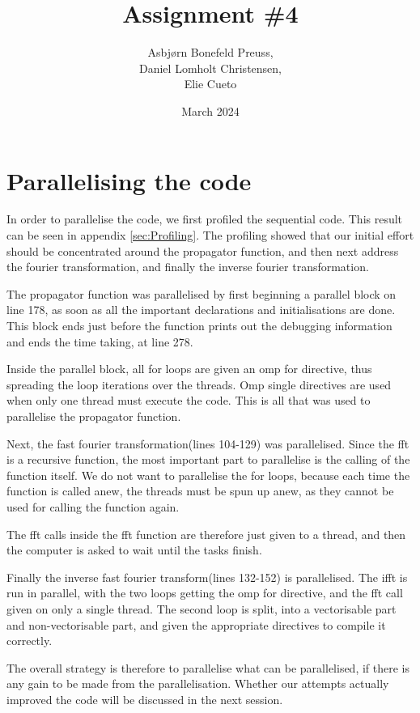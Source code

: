 \documentclass{article}
\title{Assignment \#4}
\author{Asbjørn Bonefeld Preuss,\\ Daniel Lomholt Christensen,\\ Elie Cueto}
\date{March 2024}
\begin{document}
\maketitle
\section{Parallelising the code}\label{sec:taskone}
In order to parallelise the code, we first profiled the sequential code. This result can be seen in appendix \ref{sec:Profiling}. The profiling showed that our initial effort should be concentrated around the propagator function, and then next address the fourier transformation, and finally the inverse fourier transformation.

The propagator function was parallelised by first beginning a parallel block on line 178, as soon as all the important declarations and initialisations are done. This block ends just before the function prints out the debugging information and ends the time taking, at line 278. 

Inside the parallel block, all for loops are given an omp for directive, thus spreading the loop iterations over the threads. Omp single directives are used when only one thread must execute the code. This is all that was used to parallelise the propagator function.

Next, the fast fourier transformation(lines 104-129) was parallelised. Since the fft is a recursive function, the most important part to parallelise is the calling of the function itself. We do not want to parallelise the for loops, because each time the function is called anew, the threads must be spun up anew, as they cannot be used for calling the function again.

The fft calls inside the fft function are therefore just given to a thread, and then the computer is asked to wait until the tasks finish.

Finally the inverse fast fourier transform(lines 132-152) is parallelised. The ifft is run in parallel, with the two loops getting the omp for directive, and the fft call given on only a single thread. The second loop is split, into a vectorisable part and non-vectorisable part, and given the appropriate directives to compile it correctly.

The overall strategy is therefore to parallelise what can be parallelised, if there is any gain to be made from the parallelisation. Whether our attempts actually improved the code will be discussed in the next session.
\end{document}
